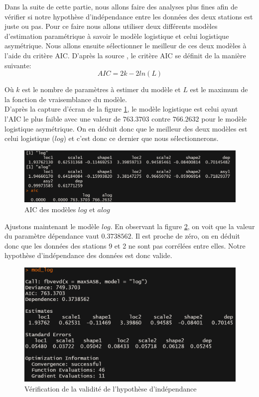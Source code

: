 \documentclass[a4paper,french,10pt]{article}
\begin{document}
Dans la suite de cette partie, nous allons faire des analyses plus fines afin de vérifier si notre hypothèse d'indépendance entre les données des deux stations est juste ou pas. Pour ce faire nous allons utiliser deux différents modèles d'estimation paramétrique à savoir le modèle logistique et celui logistique asymétrique. Nous allons ensuite sélectionner le meilleur de ces deux modèles à l'aide du critère AIC.
D'après la source \cite{AIC}, le critère AIC se définit de la manière suivante:
\[
	AIC = 2k - 2 ln(L)
\]

Où $k$ est le nombre de paramètres à estimer du modèle et $L$ est le maximum de la fonction de vraisemblance du modèle. \\
D'après la capture d'écran de la figure \ref{AIC_2_9}, le modèle logistique est celui ayant l'AIC le plus faible avec une valeur de $763.3703$ contre $766.2632$ pour le modèle logistique asymétrique. On en déduit donc que le meilleur des deux modèles est celui logistique ($log$) et c'est donc ce dernier que nous sélectionnerons.

\begin{figure}[htp] 
	\centering
	\includegraphics[scale=0.45]{images/AIC_stations2_9.png}
	\caption{AIC des modèles $log$ et $alog$}
	\label{AIC_2_9}
\end{figure}

Ajustons maintenant le modèle $log$. En observant la figure \ref{dependance_log}, on voit que la valeur du paramètre dépendance vaut $0.3738562$. Il est proche de zéro, on en déduit donc que les données des stations 9 et 2 ne sont pas corrélées entre elles. Notre hypothèse d'indépendance des données est donc valide.

\begin{figure}[htp] 
	\centering
	\includegraphics[scale=0.45]{images/dependance_log.png}
	\caption{Vérification de la validité de l'hypothèse d'indépendance}
	\label{dependance_log}
\end{figure}
\end{document}
